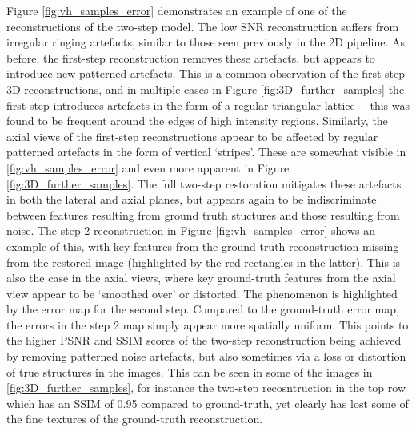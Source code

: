 \documentclass[12pt]{article}
\begin{document}
Figure \ref{fig:vh_samples_error} demonstrates an example of one of the reconstructions of the two-step model.
The low SNR reconstruction suffers from irregular ringing artefacts, similar to those seen previously in the 2D pipeline.
As before, the first-step reconstruction removes these artefacts,
but appears to introduce new patterned artefacts.
This is a common observation of the first step 3D reconstructions,
and in multiple cases in Figure \ref{fig:3D_further_samples} the first step introduces artefacts in the form of a regular triangular lattice
---this was found to be frequent around the edges of high intensity regions.
Similarly, the axial views of the first-step reconstructions appear to be affected by regular patterned artefacts in the form of vertical `stripes'.
These are somewhat visible in \ref{fig:vh_samples_error} and even more apparent in Figure \ref{fig:3D_further_samples}.
The full two-step restoration mitigates these artefacts in both the lateral and axial planes,
but appears again to be indiscriminate between features resulting from ground truth stuctures and those resulting from noise.
The step 2 reconstruction in Figure \ref{fig:vh_samples_error} shows an example of this,
with key features from the ground-truth reconstruction missing from the restored image (highlighted by the red rectangles in the latter).
This is also the case in the axial views, where key ground-truth features from the axial view appear to be `smoothed over' or distorted.
The phenomenon is highlighted by the error map for the second step.
Compared to the ground-truth error map, the errors in the step 2 map simply appear more spatially uniform.
This points to the higher PSNR and SSIM scores of the two-step reconstruction being achieved by removing patterned noise artefacts,
but also sometimes via a loss or distortion of true structures in the images.
This can be seen in some of the images in \ref{fig:3D_further_samples},
for instance the two-step recosntruction in the top row which has an SSIM of 0.95 compared to ground-truth,
yet clearly has lost some of the fine textures of the ground-truth reconstruction.
\end{document}

